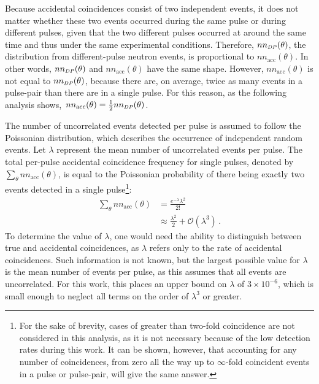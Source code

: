 \documentclass[%
 reprint,
 amsmath,amssymb,
 aps,
 nofootinbib
]{revtex4-1}
\begin{document}
Because accidental coincidences consist of two independent events, it does not matter whether these two events occurred during the same pulse or during different pulses, given that the two different pulses occurred at around the same time and thus under the same experimental conditions.
Therefore, $nn_{\scaleto{DP}{4pt}}(\theta)$, the distribution from different-pulse neutron events, is proportional to $nn_{\text{acc}}(\theta)$.
In other words,  $nn_{\scaleto{DP}{4pt}}(\theta)$ and $nn_{\text{acc}}(\theta)$ have the same shape.
However, $nn_{\text{acc}}(\theta)$ is not equal to $nn_{\scaleto{DP}{4pt}}(\theta)$, because there are, on average, twice as many events in a pulse-pair than there are in a single pulse.
For this reason, as the following analysis shows,~$nn_{\text{acc}}(\theta) = \frac{1}{2}nn_{\scaleto{DP}{4pt}}(\theta)$.

The number of uncorrelated events detected per pulse is assumed to follow the Poissonian distribution, which describes the occurrence of independent random events.
Let $\lambda$ represent the mean number of uncorrelated events per pulse.
The total per-pulse accidental coincidence frequency for single pulses, denoted by $\sum_{\theta} nn_{\text{acc}}(\theta)$, is equal to the Poissonian probability of there being exactly two events detected in a single pulse\footnote{For the sake of brevity, cases of greater than two-fold coincidence are not considered in this analysis, as it is not necessary because of the low detection rates during this work.
It can be shown, however, that accounting for any number of coincidences, from zero all the way up to $\infty$-fold coincident events in a pulse or pulse-pair, will give the same answer.}:
\begin{equation} \label{math:SP}
    \begin{split}
    \sum_{\theta} nn_{\text{acc}}(\theta) & = \frac{e^{-\lambda}\lambda^{2}}{2!} \\
        &\approx \frac{\lambda^2}{{2}} + \mathcal{O}(\lambda^3) \, .
    \end{split}
\end{equation}
To determine the value of $\lambda$, one would need the ability to distinguish between true and accidental coincidences, as $\lambda$ refers only to the rate of accidental coincidences.
Such information is not known, but the largest possible value for $\lambda$ is the mean number of events per pulse, as this assumes that all events are uncorrelated.
For this work, this places an upper bound on $\lambda$ of $3\times 10^{-6}$, which is small enough to neglect all terms on the order of $\lambda^3$ or greater.
\end{document}
